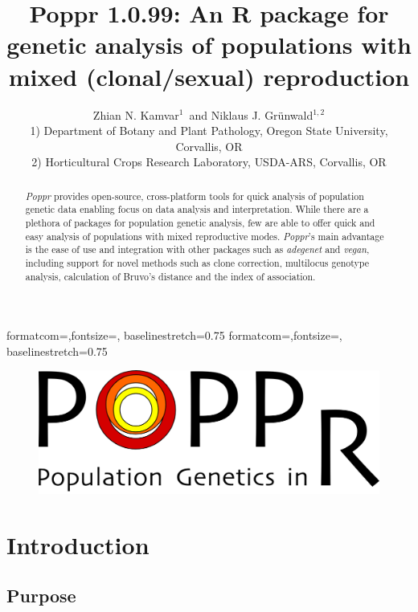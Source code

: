 \documentclass[letterpaper]{article}
\title{Poppr 1.0.99: An R package for genetic analysis of populations with mixed (clonal/sexual) reproduction}
\author{Zhian N. Kamvar$^{1}$\ and Niklaus J. Gr\"unwald$^{1,2}$\\\scriptsize{1) Department of Botany and Plant Pathology, Oregon State University, Corvallis, OR}\\\scriptsize{2) Horticultural Crops Research Laboratory, USDA-ARS, Corvallis, OR}}
\begin{document}

{formatcom={\color{Sinput}},fontsize=\footnotesize, baselinestretch=0.75}
{formatcom={\color{Soutput}},fontsize=\footnotesize, baselinestretch=0.75}
\maketitle
\begin{abstract}
\textit{Poppr} provides open-source, cross-platform tools for quick analysis of population genetic data enabling focus on data analysis and interpretation. While there are a plethora of packages for population genetic analysis, few are able to offer quick and easy analysis of populations with mixed reproductive modes. \textit{Poppr}'s main advantage is the ease of use and integration with other packages such as \textit{adegenet} and \textit{vegan}, including support for novel methods such as clone correction, multilocus genotype analysis, calculation of Bruvo's distance and the index of association. 
\end{abstract}
\begin{figure}[b]
  \centering
  \label{logo}
  \includegraphics{popprlogo}
\end{figure}
\newpage
\begingroup
\hypersetup{linkcolor=black}
\tableofcontents
\endgroup

\section{Introduction}\label{intro}
\subsection{Purpose}\label{intro:purpose}
\end{document}
